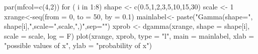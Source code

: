 \begin{Schunk}
\begin{Sinput}
 par(mfcol=c(4,2))
 for ( i in 1:8){
      shape <- c(0.5,1,2,3,5,10,15,30)
      scale <- 1
      xrange<-seq(from = 0, to = 50, by = 0.1)
      mainlabel<- paste("Gamma(shape=", shape[i],",scale=",scale,",)",sep="")
      xprob <- dgamma(xrange, shape = shape[i], scale = scale, log = F)
      plot(xrange, xprob, type = "l", main = mainlabel, xlab = "possible values of x", ylab = "probability of x")
  }
\end{Sinput}
\end{Schunk}
